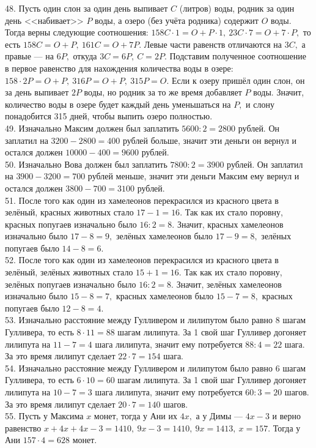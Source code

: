 48. Пусть один слон за один день выпивает $C$ (литров) воды, родник за один день <<набивает>> $P$ воды, а озеро (без учёта родника) содержит $O$ воды. Тогда верны следующие соотношения: $158C\cdot1=O+P\cdot1,\ 23C\cdot7=O+7\cdot P,$ то есть $158C=O+P,\ 161C=O+7P.$ Левые части равенств отличаются на $3C,$ а правые --- на $6P,$ откуда $3C=6P,\ C=2P.$ Подставим полученное соотношение в первое равенство для нахождения количества воды в озере: $158\cdot2P=O+P,\ 316P=O+P,\ 315P=O.$ Если к озеру пришёл один слон, он за день выпивает $2P$ воды, но родник за то же время добавляет $P$ воды. Значит, количество воды в озере будет каждый день уменьшаться на $P,$ и слону понадобится 315 дней, чтобы выпить озеро полностью.\\
49. Изначально Максим должен был заплатить $5600:2=2800$ рублей. Он заплатил на $3200-2800=400$ рублей больше, значит эти деньги он вернул и остался должен $10000-400=9600$ рублей.\\
50. Изначально Вова должен был заплатить $7800:2=3900$ рублей. Он заплатил на $3900-3200=700$ рублей меньше, значит эти деньги Максим ему вернул и остался должен $3800-700=3100$ рублей.\\
51. После того как один из хамелеонов перекрасился из красного цвета в зелёный, красных животных стало $17-1=16.$ Так как их стало поровну, красных попугаев изначально было $16:2=8.$ Значит, красных хамелеонов изначально было $17-8=9,$ зелёных хамелеонов было $17-9=8,$ зелёных попугаев было $14-8=6.$\\
52. После того как один из хамелеонов перекрасился из красного цвета в зелёный, зелёных животных стало $15+1=16.$ Так как их стало поровну, зелёных попугаев изначально было $16:2=8.$ Значит, зелёных хамелеонов изначально было $15-8=7,$ красных хамелеонов было $15-7=8,$ красных попугаев было $12-8=4.$\\
53. Изначально расстояние между Гулливером и лилипутом было равно 8 шагам Гулливера, то есть $8\cdot11=88$ шагам лилипута. За 1 свой шаг Гулливер догоняет лилипута на $11-7=4$ шага лилипута, значит ему потребуется $88:4=22$ шага. За это время лилипут сделает $22\cdot7=154$ шага.\\
54. Изначально расстояние между Гулливером и лилипутом было равно 6 шагам Гулливера, то есть $6\cdot10=60$ шагам лилипута. За 1 свой шаг Гулливер догоняет лилипута на $10-7=3$ шага лилипута, значит ему потребуется $60:3=20$ шагов. За это время лилипут сделает $20\cdot7=140$ шагов.\\
55. Пусть у Максима $x$ монет, тогда у Ани их $4x,$ а у Димы --- $4x-3$ и верно равенство $x+4x+4x-3=1410,\ 9x-3=1410,\ 9x=1413,\ x=157.$ Тогда у Ани $157\cdot4=628$ монет.\\
